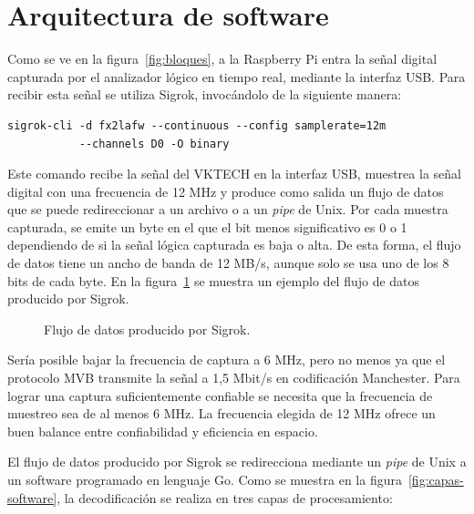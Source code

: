 \section{Arquitectura de software}
\label{sec:software}

Como se ve en la figura~\ref{fig:bloques}, a la Raspberry Pi entra la señal digital capturada por el analizador lógico en tiempo real, mediante la interfaz USB. Para recibir esta señal se utiliza Sigrok, invocándolo de la siguiente manera:

\begin{lstlisting}
sigrok-cli -d fx2lafw --continuous --config samplerate=12m
           --channels D0 -O binary
\end{lstlisting}

Este comando recibe la señal del VKTECH en la interfaz USB, muestrea la señal digital con una frecuencia de 12 MHz y produce como salida un flujo de datos que se puede redireccionar a un archivo o a un \textit{pipe} de Unix.
Por cada muestra capturada, se emite un byte en el que el bit menos significativo es 0 o 1 dependiendo de si la señal lógica capturada es baja o alta.
De esta forma, el flujo de datos tiene un ancho de banda de 12 MB/s, aunque solo se usa uno de los 8 bits de cada byte.
En la figura~\ref{fig:sigrok} se muestra un ejemplo del flujo de datos producido por Sigrok.

\begin{figure}[htbp]
	\centering
    {
        \fontsize{9pt}{9pt}\selectfont
        
    }
	\caption{Flujo de datos producido por Sigrok.}
    \label{fig:sigrok}
\end{figure}

Sería posible bajar la frecuencia de captura a 6 MHz, pero no menos ya que el protocolo MVB transmite la señal a 1,5 Mbit/s en codificación Manchester.
Para lograr una captura suficientemente confiable se necesita que la frecuencia de muestreo sea de al menos 6 MHz.
La frecuencia elegida de 12 MHz ofrece un buen balance entre confiabilidad y eficiencia en espacio.

\pagebreak

El flujo de datos producido por Sigrok se redirecciona mediante un \textit{pipe} de Unix a un software programado en lenguaje Go. Como se muestra en la figura~\ref{fig:capas-software}, la decodificación se realiza en tres capas de procesamiento:

